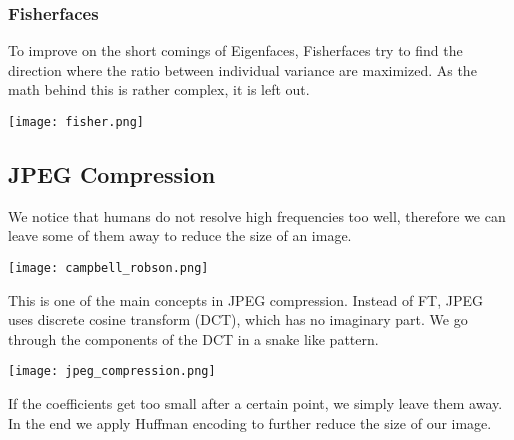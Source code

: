 \subsubsection{Fisherfaces}

To improve on the short comings of Eigenfaces, Fisherfaces try to find the direction where the ratio between individual variance are maximized. As the math behind this is rather complex, it is left out.
\begin{center}
	\texttt{[image: fisher.png]}
\end{center}


\subsection{JPEG Compression}

We notice that humans do not resolve high frequencies too well, therefore we can leave some of them away to reduce the size of an image.
\begin{center}
	\texttt{[image: campbell\_robson.png]}
\end{center}

This is one of the main concepts in JPEG compression. Instead of FT, JPEG uses discrete cosine transform (DCT), which has no imaginary part. We go through the components of the DCT in a snake like pattern.
\begin{center}
	\texttt{[image: jpeg\_compression.png]}
\end{center}

If the coefficients get too small after a certain point, we simply leave them away. In the end we apply Huffman encoding to further reduce the size of our image.
